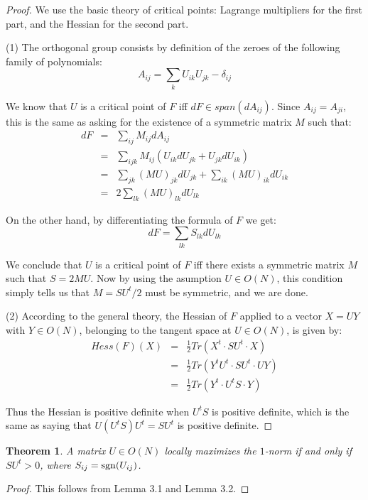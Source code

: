 \documentclass[12pt]{amsart}
\newtheorem{theorem}{Theorem}[section]
\begin{document}
\begin{proof}
We use the basic theory of critical points: Lagrange multipliers for the first part, and the Hessian for the second part.

(1) The orthogonal group consists by definition of the zeroes of the following family of polynomials:
$$A_{ij}=\sum_kU_{ik}U_{jk}-\delta_{ij}$$

We know that $U$ is a critical point of $F$ iff $dF\in span(dA_{ij})$. Since $A_{ij}=A_{ji}$, this is the same as asking for the existence of a symmetric matrix $M$ such that:
\begin{eqnarray*}
dF
&=&\sum_{ij}M_{ij}dA_{ij}\\
&=&\sum_{ijk}M_{ij}(U_{ik}dU_{jk}+U_{jk}dU_{ik})\\
&=&\sum_{jk}(MU)_{jk}dU_{jk}+\sum_{ik}(MU)_{ik}dU_{ik}\\
&=&2\sum_{lk}(MU)_{lk}dU_{lk}
\end{eqnarray*}

On the other hand, by differentiating the formula of $F$ we get:
$$dF=\sum_{lk}S_{lk}dU_{lk}$$

We conclude that $U$ is a critical point of $F$ iff there exists a symmetric matrix $M$ such that $S=2MU$. Now by using the asumption $U\in O(N)$, this condition simply tells us that $M=SU^t/2$ must be symmetric, and we are done.

(2) According to the general theory, the Hessian of $F$ applied to a vector $X=UY$ with $Y\in O(N)$, belonging to the tangent space at $U\in O(N)$, is given by:
\begin{eqnarray*}
Hess(F)(X)
&=&\frac{1}{2}Tr(X^t\cdot SU^t\cdot X)\\
&=&\frac{1}{2}Tr(Y^tU^t\cdot SU^t\cdot UY)\\
&=&\frac{1}{2}Tr(Y^t\cdot U^tS\cdot Y)
\end{eqnarray*}

Thus the Hessian is positive definite when $U^tS$ is positive definite, which is the same as saying that $U(U^tS)U^t=SU^t$ is positive definite. 
\end{proof}

\begin{theorem}
A matrix $U\in O(N)$ locally maximizes the $1$-norm if and only if $SU^t>0$, where $S_{ij}={\rm sgn}(U_{ij})$.
\end{theorem}

\begin{proof}
This follows from Lemma 3.1 and Lemma 3.2.
\end{proof}
\end{document}
